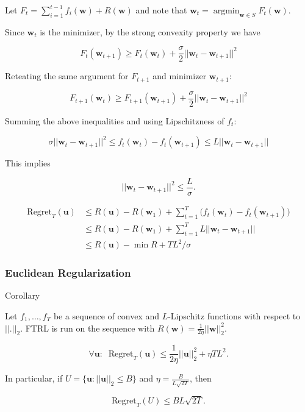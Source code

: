 \documentclass{beamer}
\DeclareMathOperator*{\argmin}{argmin}
\newcommand{\uu}{\mathbf{u}}
\newcommand{\w}{\mathbf{w}}
\begin{document}
\begin{frame}
Let $F_t = \sum_{i = 1}^{t-1} f_i(\w) + R(\w)$ and note that $\w_t = \argmin_{\w \in S} F_t(\w)$.

Since $\w_t$ is the minimizer, by the strong convexity property we have

$$F_t(\w_{t+1})\geq F_t(\w_t) + \frac{\sigma}{2} ||\w_t - \w_{t+1}||^2$$

Reteating the same argument for $F_{t+1}$ and minimizer $\w_{t+1}$:

$$F_{t+1}(\w_{t})\geq F_{t+1}(\w_{t+1}) + \frac{\sigma}{2} ||\w_t - \w_{t+1}||^2$$

\pause
Summing the above inequalities and using Lipschitzness of $f_t$:

$$\sigma||\w_t - \w_{t+1}||^2 \leq f_t(\w_t) - f_t(\w_{t+1}) \leq L||\w_t - \w_{t+1}||$$

This implies

$$||\w_t - \w_{t+1}||^2 \leq \frac{L}{\sigma}.$$
\end{frame}


\begin{frame}
\begin{align*}
\mathrm{Regret}_T(\uu) &\leq R(\uu) - R(\w_1) + \sum_{t = 1}^{T}\Big( f_t(\w_t) - f_t(\w_{t+1})\Big)\\
&\leq R(\uu) - R(\w_1) + \sum_{t = 1}^{T}L ||\w_t - \w_{t+1}||\\
& \leq R(\uu) -\min R + TL^2/\sigma 
\end{align*}
\end{frame}



\begin{frame}
\frametitle{Euclidean Regularization}

\begin{block}{Corollary}

Let $f_1, \dots, f_T$ be a sequence of convex and $L$-Lipschitz functions with respect to $||.||_2$. FTRL is run on the sequence with $R(\w) = \frac{1}{2\eta}||\w||_2^2$.

$$\forall \uu:\;\; \mathrm{Regret}_T(\uu) \leq \frac{1}{2\eta}||\uu||_2^2 + \eta TL^2.$$

In particular, if $U=\{\uu: ||\uu||_2\leq B\}$
and $\eta = \frac{B}{L\sqrt{2T}}$, then

$$\mathrm{Regret}_T(U) \leq BL\sqrt{2T}.$$

\end{block}
\end{frame}
\end{document}
